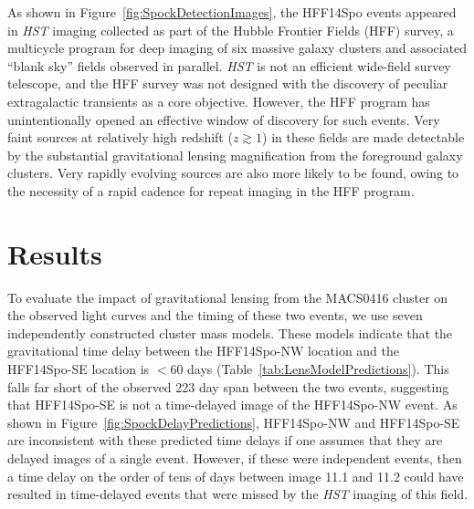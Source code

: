 \documentclass{article}
\def\HST{{\it HST}\xspace}
\def\spock{HFF14Spo\xspace}
\def\spockone{HFF14Spo-NW\xspace}
\def\spocktwo{HFF14Spo-SE\xspace}
\def\MACS0416{MACS0416\xspace}
\begin{document}
As shown in Figure~\ref{fig:SpockDetectionImages}, the \spock events
appeared in \HST imaging collected as part of
the Hubble Frontier Fields (HFF) survey\cite{Lotz:2017}, a multicycle
program for deep imaging of six massive galaxy clusters and associated
``blank sky'' fields observed in parallel.  \HST is not an efficient
wide-field survey telescope, and the HFF survey was not designed with
the discovery of peculiar extragalactic transients as a core
objective.  However, the HFF program has unintentionally opened an
effective window of discovery for such events.  Very faint sources at
relatively high redshift ($z\gtrsim1$) in these fields are made
detectable by the substantial gravitational lensing magnification from
the foreground galaxy clusters.  Very rapidly evolving sources are
also more likely to be found, owing to the necessity of a rapid cadence
for repeat imaging in the HFF program.



\section{Results}\label{sec:Results}

To evaluate the impact of gravitational lensing from the \MACS0416
cluster on the observed light curves and the timing of these two
events, we use seven independently constructed cluster mass models.
These models indicate that the gravitational time delay between the
\spockone location and the \spocktwo location is $<$60 days
(Table~\ref{tab:LensModelPredictions}).  This falls far short of the
observed 223 day span between the two events, suggesting that
\spocktwo is not a time-delayed image of the \spockone event.  As
shown in Figure~\ref{fig:SpockDelayPredictions}, \spockone and
\spocktwo are inconsistent with these predicted time delays if one
assumes that they are delayed images of a single event.  However, if
these were independent events, then a time delay on the order of tens
of days between image 11.1 and 11.2 could have resulted in
time-delayed events that were missed by the \HST imaging of this
field.
\end{document}
